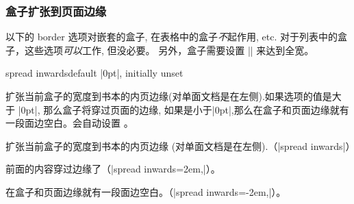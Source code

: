




\subsubsection{盒子扩张到页面边缘}

\begin{marker} 

以下的 border 选项对嵌套的盒子, 在表格中的盒子\emph{不}起作用, etc.
对于列表中的盒子，这些选项\emph{可以}工作, 但没必要。
另外，盒子需要设置 |\noindent| 来达到全宽。
\end{marker}

\begin{docTcbKey}[][doc new=2017-02-13]{spread inwards}{}{default |0pt|, initially unset}

扩张当前盒子的宽度到书本的内页边缘(对单面文档是在左侧).如果选项的值是大于 |0pt|, 那么盒子将穿过页面的边缘, 如果是小于|0pt|,那么在盒子和页面边缘就有一段面边空白。会自动设置  。
\begin{dispListing}
\begin{tcolorbox}[enhanced,spread inwards,
  colframe=blue!75!black,colback=white,show bounding box]
扩张当前盒子的宽度到书本的内页边缘 (对单面文档是在左侧).（|spread inwards|）
\end{tcolorbox}

\begin{tcolorbox}[enhanced,spread inwards=2em,
  colframe=blue!75!black,colback=white,show bounding box]
前面的内容穿过边缘了（|spread inwards=2em,|）。
\end{tcolorbox}

\begin{tcolorbox}[enhanced,spread inwards=-2em,
  colframe=blue!75!black,colback=white,show bounding box]
在盒子和页面边缘就有一段面边空白。（|spread inwards=-2em,|）。
\end{tcolorbox}
\end{dispListing}
{\tcbusetemp}
\end{docTcbKey}



